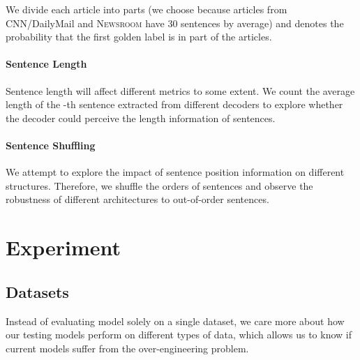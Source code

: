 \documentclass[11pt,a4paper]{article}
\begin{document}
We divide each article into  parts (we choose  because articles from CNN/DailyMail and \textsc{Newsroom} have 30 sentences by average) and  denotes the probability that the first golden label is in part  of the articles.


\paragraph{Sentence Length} Sentence length will affect different metrics to some extent. We count the average length of the -th sentence extracted from different decoders to explore whether the decoder could perceive the length information of sentences.







\paragraph{Sentence Shuffling} We attempt to explore the impact of sentence position information on different structures. Therefore, we shuffle the orders of sentences  and observe the robustness of different architectures to out-of-order sentences.




\section{Experiment}


\subsection{Datasets}
Instead of evaluating model solely on a single dataset, we care more about how our testing models perform on different types of data,  which allows us to know if current models suffer from the over-engineering problem.





\begin{table}[htbp]
  \centering
    \caption{Statistics of multi-domain datasets based on CNN/DailyMail and \textsc{NEWSROOM}.}
  \label{tab:dataset}\end{table}
\end{document}

